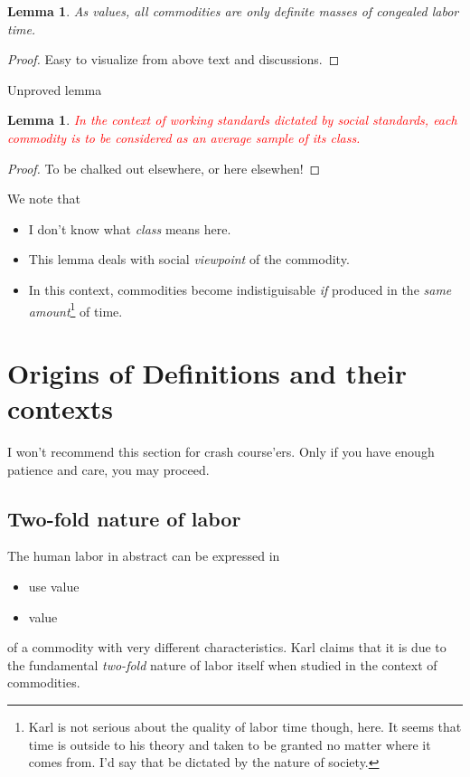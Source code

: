 \documentclass[12pt]{extarticle}
\newtheorem{lemma}[theorem]{Lemma}
\theoremstyle{definition}
\newenvironment{remark}[1][Remark]{\begin{trivlist}
\item[\hskip \labelsep {\bfseries #1}]}{\end{trivlist}}
\begin{document}
        \begin{lemma}
          As values, all commodities are only definite masses of congealed labor time.
        \end{lemma}
        \begin{proof}
          Easy to visualize from above text and discussions.
        \end{proof}

        Unproved lemma
        \begin{lemma}
          \textcolor{red}{In the context of working standards dictated by social standards, each commodity is to be considered as an average sample of its class.}
        \end{lemma}
        \begin{proof}
          To be chalked out elsewhere, or here elsewhen!
        \end{proof}
        \begin{remark}
          \label{rem:comclass}
          We note that
          \begin{itemize}
          \item I don't know what \emph{class} means here.
          \item This lemma deals with social \emph{viewpoint} of the commodity.
            \item In this context, commodities become indistiguisable \emph{if} produced in the \emph{same amount}\footnote{Karl is not serious about the quality of labor time though, here.  It seems that time is outside to his theory and taken to be granted no matter where it comes from.  I'd say that be dictated by the nature of society.} of time.
          \end{itemize}
        \end{remark}

\section{Origins of Definitions and their contexts}
I won't recommend this section for crash course'ers.  Only if you have enough patience and care, you may proceed.
\subsection{Two-fold nature of labor}
The human labor in abstract can be expressed in
\begin{itemize}
\item use value
\item value
\end{itemize}
of a commodity with very different characteristics.  Karl claims that it is due to the fundamental \emph{two-fold} nature of labor itself when studied in the context of commodities.
\end{document}
